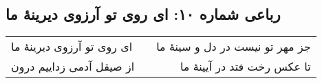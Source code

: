 \begin{center}
\section*{رباعی شماره ۱۰: ای روی تو آرزوی دیرینهٔ ما}
\label{sec:010}
\begin{longtable}{l p{0.5cm} r}
ای روی تو آرزوی دیرینهٔ ما
&&
جز مهر تو نیست در دل و سینهٔ ما
\\
از صیقل آدمی زداییم درون
&&
تا عکس رخت فتد در آیینهٔ ما
\\
\end{longtable}
\end{center}
